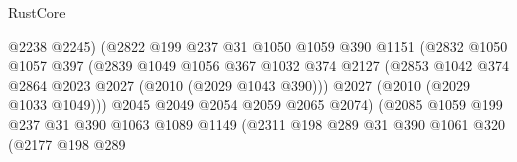 \begin{lexlean}{RustCore}
\begin{coremodule}
                                      @2238
                                      @2245)
                                    (@2822
                                      @199
                                      @237
                                      @31
                                      @1050
                                      @1059
                                      @390
                                      @1151
                                      (@2832
                                        @1050
                                        @1057
                                        @397
                                        (@2839
                                          @1049
                                          @1056
                                          @367
                                          @1032
                                          @374
                                          @2127
                                          (@2853
                                            @1042
                                            @374
                                            @2864
                                            @2023
                                            @2027
                                            (@2010 (@2029 @1043 @390)))
                                          @2027
                                          (@2010 (@2029 @1033 @1049)))
                                        @2045
                                        @2049
                                        @2054
                                        @2059
                                        @2065
                                        @2074)
                                      (@2085
                                        @1059
                                        @199
                                        @237
                                        @31
                                        @390
                                        @1063
                                        @1089
                                        @1149
                                        (@2311
                                          @198
                                          @289
                                          @31
                                          @390
                                          @1061
                                          @320
                                          (@2177
                                            @198
                                            @289

\end{coremodule}
\end{lexlean}
